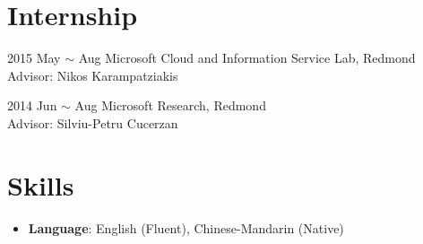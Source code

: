 \documentclass[a4paper, 11pt]{article}
\begin{document}

\section{Internship}
\begin{CV}
\item[2015 May $\sim$ Aug]Microsoft Cloud and Information Service Lab, Redmond\\
Advisor: Nikos Karampatziakis\\
\item[2014 Jun $\sim$ Aug]Microsoft Research, Redmond\\
Advisor: Silviu-Petru Cucerzan
\end{CV}

\section{Skills}
\begin{itemize}

\item \textbf{Language}: English (Fluent), Chinese-Mandarin (Native)
\end{itemize}
    
\end{document}
